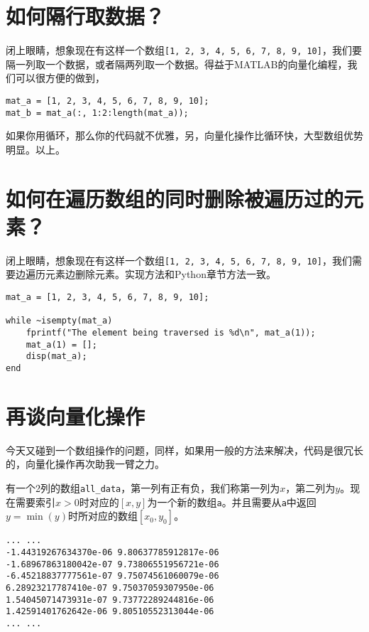 \section{如何隔行取数据？}

闭上眼睛，想象现在有这样一个数组\texttt{[1, 2, 3, 4, 5, 6, 7, 8, 9, 10]}，我们要隔一列取一个数据，或者隔两列取一个数据。得益于MATLAB的向量化编程，我们可以很方便的做到，

\begin{verbatim}
mat_a = [1, 2, 3, 4, 5, 6, 7, 8, 9, 10];
mat_b = mat_a(:, 1:2:length(mat_a));
\end{verbatim}

如果你用循环，那么你的代码就不优雅，另，向量化操作比循环快，大型数组优势明显。以上。

\section{如何在遍历数组的同时删除被遍历过的元素？}

闭上眼睛，想象现在有这样一个数组\texttt{[1, 2, 3, 4, 5, 6, 7, 8, 9, 10]}，我们需要边遍历元素边删除元素。实现方法和Python章节方法一致。

\begin{verbatim}
mat_a = [1, 2, 3, 4, 5, 6, 7, 8, 9, 10];

while ~isempty(mat_a)
    fprintf("The element being traversed is %d\n", mat_a(1));
    mat_a(1) = [];
    disp(mat_a);
end
\end{verbatim}

\section{再谈向量化操作}

今天又碰到一个数组操作的问题，同样，如果用一般的方法来解决，代码是很冗长的，向量化操作再次助我一臂之力。

有一个2列的数组\texttt{all_data}，第一列有正有负，我们称第一列为$ x $，第二列为$ y $。现在需要索引$ x>0 $时对应的$ [x, y] $为一个新的数组\texttt{a}。并且需要从\texttt{a}中返回$ y=\min(y) $时所对应的数组$ [x_0, y_0] $。

\begin{verbatim}
... ...
-1.44319267634370e-06 9.80637785912817e-06
-1.68967863180042e-07 9.73806551956721e-06
-6.45218837777561e-07 9.75074561060079e-06
6.28923217787410e-07 9.75037059307950e-06
1.54045071473931e-07 9.73772289244816e-06
1.42591401762642e-06 9.80510552313044e-06
... ...
\end{verbatim}

